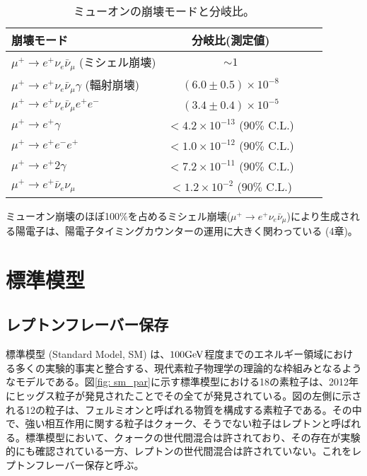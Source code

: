\documentclass[Yonemoto_master.tex]{subfiles}
\begin{document}
\begin{table}[h]
 \centering
 \caption{ミューオンの崩壊モードと分岐比\cite{muon}。}
  \begin{tabular}{lccc}
   \hline
   崩壊モード & 分岐比(測定値)\\
   \hline \hline
   $\mu^+ \to e^+\nu_e\bar{\nu}_{\mu}$ (ミシェル崩壊)& $\sim 1$ \\
   $\mu^+ \to e^+\nu_e\bar{\nu}_{\mu}\gamma$ (輻射崩壊)& $(6.0 \pm 0.5) \times 10^{-8} $ \\
   $\mu^+ \to e^+\nu_e\bar{\nu}_{\mu}e^+e^- $ & $(3.4 \pm 0.4) \times 10^{-5} $ \\
   \hline
   $\mu^+ \to e^+\gamma$ & $< 4.2 \times 10^{-13}$ ($90 \%$ C.L.)\\
   $\mu^+ \to e^+e^-e^+$ & $< 1.0 \times 10^{-12} $ ($90 \%$ C.L.)\\
   $\mu^+ \to e^+2\gamma$ & $< 7.2 \times 10^{-11}$ ($90 \%$ C.L.)\\
   $\mu^+ \to e^+\bar{\nu}_e\nu_{\mu}$ & $< 1.2 \times 10^{-2} $ ($90 \%$ C.L.)\\
   \hline
  \end{tabular}
\end{table}
\label{tab: Mu_mode}

ミューオン崩壊のほぼ100\%を占めるミシェル崩壊($\mu^+ \to e^+\nu_e\bar{\nu}_{\mu}$)により生成される陽電子は、陽電子タイミングカウンターの運用に大きく関わっている (4章)。%

\section{標準模型}
\subsection{レプトンフレーバー保存}
標準模型 (Standard Model, SM) は、$100 \rm{GeV}$程度までのエネルギー領域における多くの実験的事実と整合する、現代素粒子物理学の理論的な枠組みとなるようなモデルである。図\ref{fig: sm_par}に示す標準模型における18の素粒子は、2012年にヒッグス粒子が発見されたことでその全てが発見されている。図の左側に示される12の粒子は、フェルミオンと呼ばれる物質を構成する素粒子である。その中で、強い相互作用に関する粒子はクォーク、そうでない粒子はレプトンと呼ばれる。標準模型において、クォークの世代間混合は許されており、その存在が実験的にも確認されている一方、レプトンの世代間混合は許されていない。これをレプトンフレーバー保存と呼ぶ。
\end{document}
